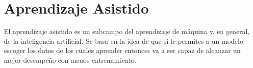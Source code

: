 
\section{Aprendizaje Asistido}


El aprendizaje asistido es un subcampo del aprendizaje de máquina y, en general, de la inteligencia artificial. Se basa en la idea de que si le permites a un modelo escoger los datos de los cuales aprender entonces va a ser capaz de alcanzar un mejor desempeño con menos entrenamiento.




